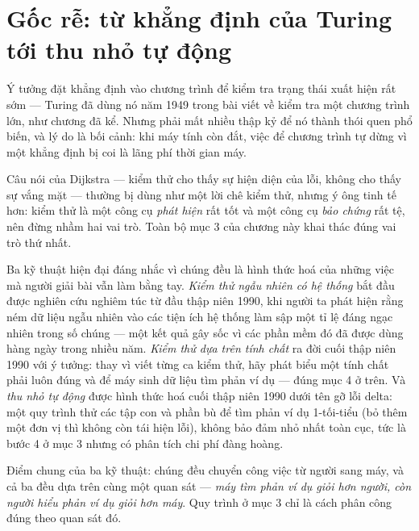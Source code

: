 \documentclass[../../algorithm.tex]{subfiles}
\begin{document}
\section{Gốc rễ: từ khẳng định của Turing tới thu nhỏ tự động}

Ý tưởng đặt khẳng định vào chương trình để kiểm tra trạng thái xuất hiện rất sớm --- Turing đã dùng nó năm 1949 trong bài viết về kiểm tra một chương trình lớn, như chương  đã kể. Nhưng phải mất nhiều thập kỷ để nó thành thói quen phổ biến, và lý do là bối cảnh: khi máy tính còn đắt, việc để chương trình tự dừng vì một khẳng định bị coi là lãng phí thời gian máy.

Câu nói của Dijkstra --- kiểm thử cho thấy sự hiện diện của lỗi, không cho thấy sự vắng mặt --- thường bị dùng như một lời chê kiểm thử, nhưng ý ông tinh tế hơn: kiểm thử là một công cụ \emph{phát hiện} rất tốt và một công cụ \emph{bảo chứng} rất tệ, nên đừng nhầm hai vai trò. Toàn bộ mục 3 của chương này khai thác đúng vai trò thứ nhất.

Ba kỹ thuật hiện đại đáng nhắc vì chúng đều là hình thức hoá của những việc mà người giải bài vẫn làm bằng tay. \emph{Kiểm thử ngẫu nhiên có hệ thống} bắt đầu được nghiên cứu nghiêm túc từ đầu thập niên 1990, khi người ta phát hiện rằng ném dữ liệu ngẫu nhiên vào các tiện ích hệ thống làm sập một tỉ lệ đáng ngạc nhiên trong số chúng --- một kết quả gây sốc vì các phần mềm đó đã được dùng hàng ngày trong nhiều năm. \emph{Kiểm thử dựa trên tính chất} ra đời cuối thập niên 1990 với ý tưởng: thay vì viết từng ca kiểm thử, hãy phát biểu một tính chất phải luôn đúng và để máy sinh dữ liệu tìm phản ví dụ --- đúng mục 4 ở trên. Và \emph{thu nhỏ tự động} được hình thức hoá cuối thập niên 1990 dưới tên gỡ lỗi delta: một quy trình thử các tập con và phần bù để tìm phản ví dụ 1-tối-tiểu (bỏ thêm một đơn vị thì không còn tái hiện lỗi), không bảo đảm nhỏ nhất toàn cục\cite{zeller2002}, tức là bước 4 ở mục 3 nhưng có phân tích chi phí đàng hoàng.

Điểm chung của ba kỹ thuật: chúng đều chuyển công việc từ người sang máy, và cả ba đều dựa trên cùng một quan sát --- \emph{máy tìm phản ví dụ giỏi hơn người, còn người hiểu phản ví dụ giỏi hơn máy}. Quy trình ở mục 3 chỉ là cách phân công đúng theo quan sát đó.
\end{document}
